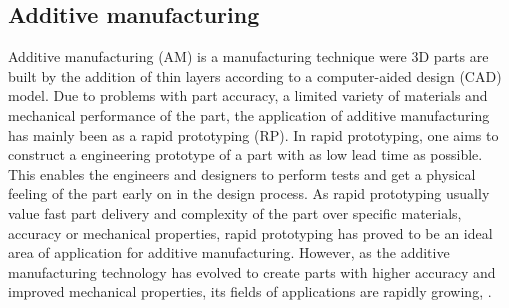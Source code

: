\subsection{Additive manufacturing}
\label{sec:AM}
Additive manufacturing (AM) is a manufacturing technique were 3D parts are built by the addition of thin layers according to a computer-aided design (CAD) model. Due to problems with part accuracy, a limited variety of materials and mechanical performance of the part, the application of additive manufacturing has mainly been as a rapid prototyping (RP). In rapid prototyping, one aims to construct a engineering prototype of a part with as low lead time as possible. This enables the engineers and designers to perform tests and get a physical feeling of the part early on in the design process. As rapid prototyping usually value fast part delivery and complexity of the part over specific materials, accuracy or mechanical properties, rapid prototyping has proved to be an ideal area of application for additive manufacturing. However, as the additive manufacturing technology has evolved to create parts with higher accuracy and improved mechanical properties, its fields of applications are rapidly growing, \citep{Manufacturing}.


